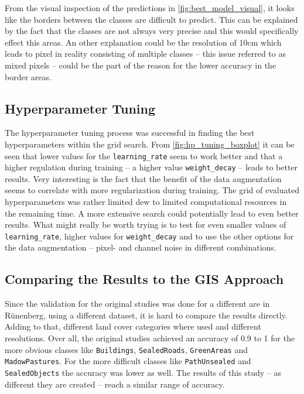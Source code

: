 From the visual inspection of the predictions in \autoref{fig:best_model_visual},
it looks like the borders between the classes are difficult to predict. This can be
explained by the fact that the classes are not always very precise and this would
specifically effect this areas. An other explanation could be the resolution of 10cm
which leads to pixel in reality consisting of multiple classes -- this issue referred to
as mixed pixels -- could be the part of the reason for the lower accuracy in the
border areas.

\subsection{Hyperparameter Tuning}

The hyperparameter tuning process was successful in finding the best hyperparameters
within the grid search. From \autoref{fig:hp_tuning_boxplot} it can be seen that
lower values for the \texttt{learning\_rate} seem to work better and that
a higher regulation during training -- a higher value \texttt{weight\_decay} -- leads to
better results. Very interesting is the fact that the benefit of the data augmentation
seems to correlate with more regularization during training.
The grid of evaluated hyperparameters was rather limited dew to limited computational
resources in the remaining time. A more extensive search could potentially lead to
even better results. What might really be worth trying is to test for even smaller
values of \texttt{learning\_rate}, higher values for \texttt{weight\_decay} 
and to use the other options for the data augmentation --
pixel- and channel noise in different combinations.

\subsection{Comparing the Results to the GIS Approach}

Since the validation for the original studies was done for a different are in Rünenberg,
using a different dataset, it is hard to compare the results directly. Adding to that,
different land cover categories where used and different resolutions. Over all, the
original studies achieved an accuracy of 0.9 to 1 for the more obvious classes like
\texttt{Buildings}, \texttt{SealedRoads}, \texttt{GreenAreas} and \texttt{MadowPastures}. 
For the more difficult classes like \texttt{PathUnsealed} and \texttt{SealedObjects} the
accuracy was lower as well. The results of this study -- as different they are created --
reach a similar range of accuracy.

